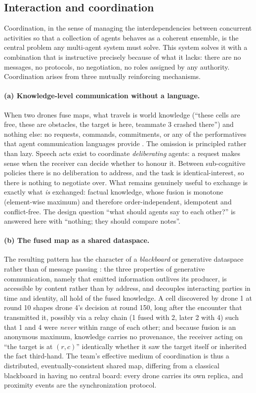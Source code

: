 \subsection{Interaction and coordination}
\label{subsec:mas-coordination}

Coordination, in the sense of managing the interdependencies between concurrent
activities so that a collection of agents behaves as a coherent ensemble, is the
central problem any multi-agent system must solve. This system solves it with a
combination that is instructive precisely because of what it lacks: there are no
messages, no protocols, no negotiation, no roles assigned by any authority.
Coordination arises from three mutually reinforcing mechanisms.

\paragraph{(a) Knowledge-level communication without a language.}
When two drones fuse maps, what travels is world knowledge (``these cells are
free, these are obstacles, the target is here, teammate 3 crashed there'') and
nothing else: no requests, commands, commitments, or any of the performatives
that agent communication languages provide \citep{finin1994kqml}. The omission is
principled rather than lazy. Speech acts exist to coordinate \emph{deliberating}
agents: a request makes sense when the receiver can decide whether to honour it.
Between sub-cognitive policies there is no deliberation to address, and the task
is identical-interest, so there is nothing to negotiate over. What remains
genuinely useful to exchange is exactly what \emph{is} exchanged: factual
knowledge, whose fusion is monotone (element-wise maximum) and therefore
order-independent, idempotent and conflict-free. The design question ``what
should agents say to each other?'' is answered here with ``nothing; they should
compare notes''.

\paragraph{(b) The fused map as a shared dataspace.}
The resulting pattern has the character of a \emph{blackboard} or generative
dataspace rather than of message passing
\citep{nii1986blackboard,gelernter1985generative}: the three properties of
generative communication, namely that emitted information outlives its producer,
is accessible by content rather than by address, and decouples interacting
parties in time and identity, all hold of the fused knowledge. A cell discovered
by drone 1 at round 10 shapes drone 4's decision at round 150, long after the
encounter that transmitted it, possibly via a relay chain (1 fused with 2, later
2 with 4) such that 1 and 4 were \emph{never} within range of each other; and
because fusion is an anonymous maximum, knowledge carries no provenance, the
receiver acting on ``the target is at $(r,c)$'' identically whether it saw the
target itself or inherited the fact third-hand. The team's effective medium of
coordination is thus a distributed, eventually-consistent shared map, differing
from a classical blackboard in having no central board: every drone carries its
own replica, and proximity events are the synchronization protocol.


